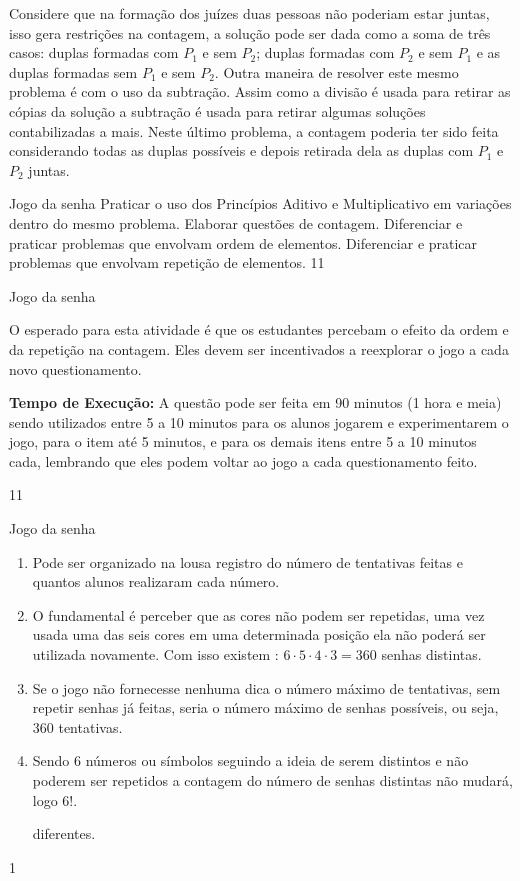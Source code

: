 Considere que na formação dos juízes duas pessoas não poderiam estar juntas, isso gera restrições na contagem, a solução pode ser dada como a soma de três casos: duplas formadas com  $P_1$ e sem $P_2$; duplas formadas com  $P_2$ e sem $P_1$ e as duplas formadas sem $P_1$ e sem $P_2$. Outra maneira de resolver este mesmo problema é com o uso da subtração. Assim como a divisão é usada para retirar as cópias da solução a subtração é usada para retirar algumas soluções contabilizadas a mais. Neste último problema, a contagem poderia ter sido feita considerando todas as duplas possíveis e depois retirada dela as duplas com $P_1$ e $P_2$ juntas. 
\def\currentcolor{session2}
\begin{objectives}{Jogo da senha}
{
Praticar o uso dos Princípios Aditivo e Multiplicativo em variações dentro do mesmo problema. Elaborar questões de contagem. Diferenciar e praticar problemas que envolvam ordem de elementos. Diferenciar e praticar problemas que envolvam repetição de elementos.
}{1}{1}
\end{objectives}
\begin{sugestions}{Jogo da senha}
{
O esperado para esta atividade é que os estudantes percebam o efeito da ordem e da repetição na contagem. Eles devem ser incentivados a reexplorar o jogo a cada novo questionamento.

\textbf{Tempo de Execução:} A questão pode ser feita em 90 minutos (1 hora e meia) sendo utilizados entre 5 a 10 minutos para os alunos jogarem e experimentarem o jogo,  para o item  até 5  minutos, e para os demais itens entre 5 a 10 minutos cada, lembrando que eles podem voltar ao jogo a cada questionamento feito.
}{1}{1}
\end{sugestions}
\begin{answer}{Jogo da senha}
{
\begin{enumerate}
\item Pode ser organizado na lousa registro do número de tentativas feitas e quantos alunos realizaram cada número. 

\setcounter{enumi}{2}
\item O fundamental é perceber que as cores não podem ser repetidas, uma vez usada uma das seis cores em uma determinada posição ela não poderá ser utilizada novamente. Com isso existem : $6 \cdot 5 \cdot 4 \cdot 3 = 360$ senhas distintas. 
\item Se o jogo não fornecesse nenhuma dica o número máximo de tentativas, sem repetir senhas já feitas, seria o número máximo de senhas possíveis, ou seja, $360$ tentativas.

\item Sendo 6 números ou símbolos seguindo a ideia de serem distintos e não poderem ser repetidos a contagem do número de senhas distintas não mudará, logo $6!$. 

diferentes.
\end{enumerate}
}{1}
\end{answer}

